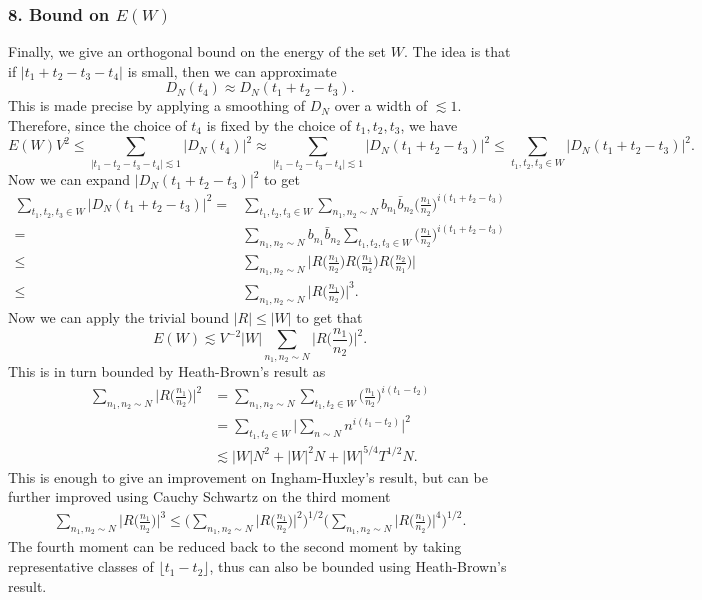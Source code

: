 \subsubsection*{8. Bound on $E(W)$}
Finally, we give an orthogonal bound on the energy of the set $W$. The idea is that if $|t_1+t_2-t_3-t_4|$ is small, then we can approximate \[
D_N(t_4) \approx D_N(t_1+t_2-t_3).
\]
This is made precise by applying a smoothing of $D_N$ over a width of $\lesssim 1$.
Therefore, since the choice of $t_4$ is fixed by the choice of $t_1,t_2,t_3$, we have\[
E(W)V^2\leq \sum_{|t_1-t_2-t_3-t_4|\lesssim 1} |D_N(t_4)|^2 \approx \sum_{|t_1-t_2-t_3-t_4|\lesssim 1} |D_N(t_1+t_2-t_3)|^2 \leq \sum_{t_1,t_2,t_3\in W} |D_N(t_1+t_2-t_3)|^2.
\]
Now we can expand $|D_N(t_1+t_2-t_3)|^2$ to get \begin{align*}
    \sum_{t_1,t_2,t_3\in W} |D_N(t_1+t_2-t_3)|^2=& \sum_{t_1,t_2,t_3\in W}\sum_{n_1,n_2\sim N} b_{n_1} \bar{b}_{n_2} \Big(\frac{n_1}{n_2}\Big)^{i(t_1+t_2-t_3)}\\ 
    =&\sum_{n_1,n_2\sim N} b_{n_1} \bar{b}_{n_2}\sum_{t_1,t_2,t_3\in W}\Big(\frac{n_1}{n_2}\Big)^{i(t_1+t_2-t_3)}\\ 
    \leq& \sum_{n_1,n_2\sim N} \Big|R\Big(\frac{n_1}{n_2}\Big)R\Big(\frac{n_1}{n_2}\Big)R\Big(\frac{n_2}{n_1}\Big)\Big|\\ 
    \leq& \sum_{n_1,n_2\sim N} \Big|R\Big(\frac{n_1}{n_2}\Big)\Big|^3.
\end{align*}
Now we can apply the trivial bound $|R|\leq |W|$ to get that \[
    E(W)\lesssim V^{-2}|W|\sum_{n_1,n_2\sim N} \Big|R\Big(\frac{n_1}{n_2}\Big)\Big|^2.
\]
This is in turn bounded by Heath-Brown's result as \begin{align*}
    \sum_{n_1,n_2\sim N} \Big|R\Big(\frac{n_1}{n_2}\Big)\Big|^2 &=
    \sum_{n_1,n_2\sim N}\sum_{t_1,t_2\in W} \Big(\frac{n_1}{n_2}\Big)^{i(t_1-t_2)}\\ 
    &= \sum_{t_1,t_2\in W} \Big|\sum_{n\sim N} n^{i(t_1-t_2)} \Big|^2\\
    &\lesssim |W|N^2+|W|^2N+|W|^{5/4}T^{1/2}N.
\end{align*}
This is enough to give an improvement on Ingham-Huxley's result, but can be further improved using Cauchy Schwartz on the third moment \begin{align*}
    \sum_{n_1,n_2\sim N} \Big|R\Big(\frac{n_1}{n_2}\Big)\Big|^3 \leq 
    \Bigg(\sum_{n_1,n_2\sim N} \Big|R\Big(\frac{n_1}{n_2}\Big)\Big|^2 \Bigg)^{1/2} \Bigg(\sum_{n_1,n_2\sim N} \Big|R\Big(\frac{n_1}{n_2}\Big)\Big|^4\Bigg)^{1/2}.
\end{align*}
The fourth moment can be reduced back to the second moment by taking representative classes of $\lfloor t_1-t_2 \rfloor$, thus can also be bounded using Heath-Brown's result. 